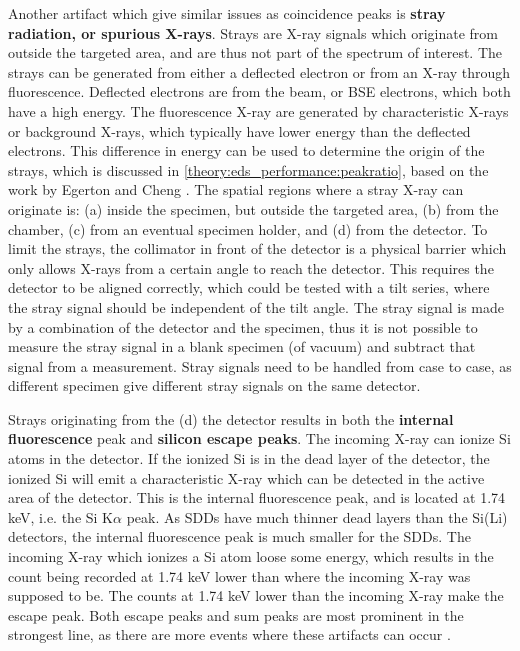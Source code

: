 Another artifact which give similar issues as coincidence peaks is \textbf{stray radiation, or spurious X-rays}.
Strays are X-ray signals which originate from outside the targeted area, and are thus not part of the spectrum of interest.
The strays can be generated from either a deflected electron or from an X-ray through fluorescence.
Deflected electrons are from the beam, or BSE electrons, which both have a high energy.
The fluorescence X-ray are generated by characteristic X-rays or background X-rays, which typically have lower energy than the deflected electrons.
This difference in energy can be used to determine the origin of the strays, which is discussed in \cref{theory:eds_performance:peakratio}, based on the work by Egerton and Cheng \cite{egerton_nio_characterization_1994}.
The spatial regions where a stray X-ray can originate is: (a) inside the specimen, but outside the targeted area, (b) from the chamber, (c) from an eventual specimen holder, and (d) from the detector.
To limit the strays, the collimator in front of the detector is a physical barrier which only allows X-rays from a certain angle to reach the detector.
This requires the detector to be aligned correctly, which could be tested with a tilt series, where the stray signal should be independent of the tilt angle.
The stray signal is made by a combination of the detector and the specimen, thus it is not possible to measure the stray signal in a blank specimen (of vacuum) and subtract that signal from a measurement.
Stray signals need to be handled from case to case, as different specimen give different stray signals on the same detector.


Strays originating from the (d) the detector results in both the \textbf{internal fluorescence} peak and \textbf{silicon escape peaks}.
The incoming X-ray can ionize Si atoms in the detector.
If the ionized Si is in the dead layer of the detector, the ionized Si will emit a characteristic X-ray which can be detected in the active area of the detector.
This is the internal fluorescence peak, and is located at 1.74 keV, i.e. the Si K$\alpha$ peak.
As SDDs have much thinner dead layers than the Si(Li) detectors, the internal fluorescence peak is much smaller for the SDDs.
The incoming X-ray which ionizes a Si atom loose some energy, which results in the count being recorded at 1.74 keV lower than where the incoming X-ray was supposed to be.
The counts at 1.74 keV lower than the incoming X-ray make the escape peak.
Both escape peaks and sum peaks are most prominent in the strongest line, as there are more events where these artifacts can occur \cite{astm_e1508_eds_quantification}.



